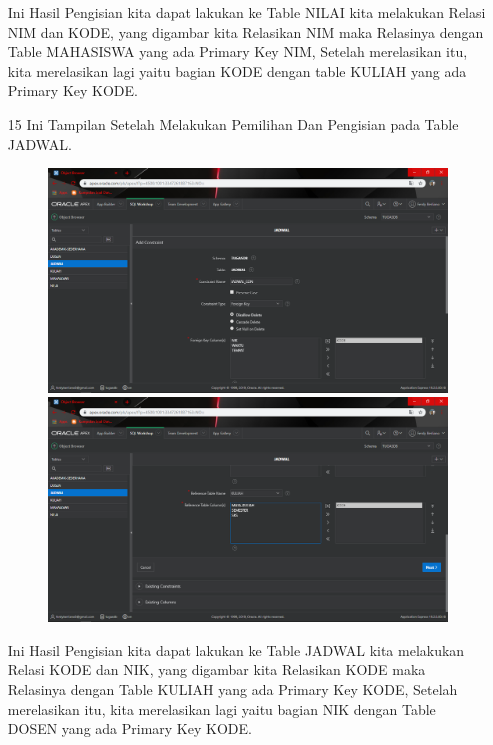 \begin{enumerate}
\par
Ini Hasil Pengisian kita dapat lakukan ke Table NILAI kita melakukan Relasi NIM dan KODE, yang digambar kita Relasikan NIM maka Relasinya dengan Table MAHASISWA yang ada Primary Key NIM, Setelah merelasikan itu, kita merelasikan lagi yaitu bagian KODE dengan table KULIAH yang ada Primary Key KODE.

\item[15]Ini Tampilan Setelah Melakukan Pemilihan Dan Pengisian pada Table JADWAL.

\begin{figure}[!htbp]
    \begin{center}
    \includegraphics[scale=0.3]{figures/17.png}
    \includegraphics[scale=0.3]{figures/18.png}
    \end{center}   
    \end{figure}
    
\par
Ini Hasil Pengisian kita dapat lakukan ke Table JADWAL kita melakukan Relasi KODE dan NIK, yang digambar kita Relasikan KODE maka Relasinya dengan Table KULIAH yang ada Primary Key KODE, Setelah merelasikan itu, kita merelasikan lagi yaitu bagian NIK dengan Table DOSEN yang ada Primary Key KODE.


\end{enumerate}
